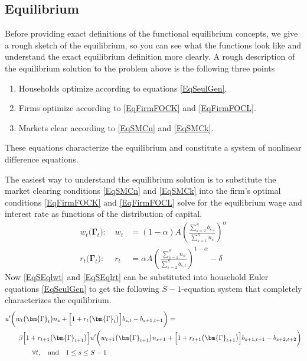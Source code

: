 \documentclass[letterpaper,12pt]{article}
\theoremstyle{definition}
\numberwithin{equation}{section}
\numberwithin{exercise}{section}
\begin{document}
\begin{spacing}{1.5}
   \subsection{Equilibrium}\label{SecSperSimpEqlb}

      Before providing exact definitions of the functional equilibrium concepts, we give a rough sketch of the equilibrium, so you can see what the functions look like and understand the exact equilibrium definition more clearly. A rough description of the equilibrium solution to the problem above is the following three points
      \begin{enumerate}
         \item Households optimize according to equations \eqref{EqSeulGen}.
         \item Firms optimize according to \eqref{EqFirmFOCK} and \eqref{EqFirmFOCL}.
         \item Markets clear according to \eqref{EqSMCn} and \eqref{EqSMCk}.
      \end{enumerate}
      These equations characterize the equilibrium and constitute a system of nonlinear difference equations.

      The easiest way to understand the equilibrium solution is to substitute the  market clearing conditions \eqref{EqSMCn} and \eqref{EqSMCk} into the firm's optimal conditions \eqref{EqFirmFOCK} and \eqref{EqFirmFOCL} solve for the equilibrium wage and interest rate as functions of the distribution of capital.
      \begin{align}
         w_t\bigl(\bm{\Gamma}_t\bigr):\quad w_t &= (1-\alpha)A\left(\frac{\sum_{s=2}^S b_{s,t}}{\sum_{s=1}^S n_s}\right)^\alpha \label{EqSEqlwt} \\
         r_t\bigl(\bm{\Gamma}_t\bigr):\:\quad r_t &= \alpha A\left(\frac{\sum_{s=1}^S n_s}{\sum_{s=2}^S b_{s,t}}\right)^{1-\alpha} - \delta \label{EqSEqlrt}
      \end{align}
      Now \eqref{EqSEqlwt} and \eqref{EqSEqlrt} can be substituted into household Euler equations \eqref{EqSeulGen} to get the following $S-1$-equation system that completely characterizes the equilibrium.
      \begin{equation}\label{EqSEqlEulGen}
         \begin{split}
            &u'\biggl(w_t\bigl(\bm{\Gamma}_t\bigr)n_s + \Bigl[1 + r_{t}\bigl(\bm{\Gamma}_t\bigr)\Bigr]b_{s,t} - b_{s+1,t+1}\biggr) =  \\
            &\qquad \beta\Bigl[1+r_{t+1}\bigl(\bm{\Gamma}_{t+1}\bigr)\Bigr]u'\biggl(w_{t+1}\bigl(\bm{\Gamma}_{t+1}\bigr)n_{s+1} + \Bigl[1 + r_{t+1}\bigl(\bm{\Gamma}_{t+1}\bigr)\Bigr]b_{s+1,t+1} - b_{s+2,t+2}\biggr) \\
            &\qquad\qquad\forall t,\quad\text{and}\quad 1\leq s\leq S-1
         \end{split}
      \end{equation}


\end{spacing}
\end{document}
